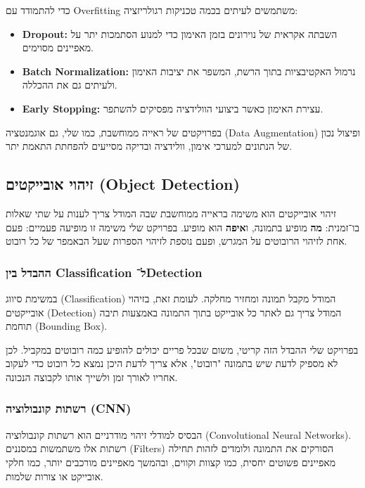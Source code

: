 כדי להתמודד עם \textenglish{Overfitting} משתמשים לעיתים בכמה טכניקות
רגולריזציה:
\begin{itemize}
\item \textbf{\textenglish{Dropout}:} השבתה אקראית של נוירונים בזמן
האימון כדי למנוע הסתמכות יתר על מאפיינים מסוימים.
\item \textbf{\textenglish{Batch Normalization}:} נרמול האקטיבציות
בתוך הרשת, המשפר את יציבות האימון ולעיתים גם את ההכללה.
\item \textbf{\textenglish{Early Stopping}:} עצירת האימון כאשר ביצועי
הוולידציה מפסיקים להשתפר.
\end{itemize}

בפרויקטים של ראייה ממוחשבת, כמו שלי, גם אוגמנטציה (\textenglish{Data
  Augmentation}) ופיצול נכון של הנתונים למערכי אימון, וולידציה ובדיקה
מסייעים להפחתת התאמת יתר.

\subsection{זיהוי אובייקטים (\textenglish{Object Detection})}

זיהוי אובייקטים הוא משימה בראייה ממוחשבת שבה המודל צריך לענות על שתי
שאלות בו־זמנית: \textbf{מה} מופיע בתמונה, ו\textbf{איפה} הוא מופיע.
בפרויקט שלי משימה זו מופיעה פעמיים: פעם אחת לזיהוי הרובוטים על המגרש,
ופעם נוספת לזיהוי הספרות שעל הבאמפר של כל רובוט.

\subsubsection{ההבדל בין \textenglish{Classification}
ל־\textenglish{Detection}}

במשימת סיווג (\textenglish{Classification}) המודל מקבל תמונה ומחזיר
מחלקה. לעומת זאת, בזיהוי אובייקטים (\textenglish{Detection}) המודל
צריך גם לאתר כל אובייקט בתוך התמונה באמצעות תיבה תוחמת
(\textenglish{Bounding Box}).

בפרויקט שלי ההבדל הזה קריטי, משום שבכל פריים יכולים להופיע כמה רובוטים
במקביל. לכן לא מספיק לדעת שיש בתמונה "רובוט", אלא צריך לדעת היכן נמצא
כל רובוט כדי לעקוב אחריו לאורך זמן ולשייך אותו לקבוצה הנכונה.

\subsubsection{רשתות קונבולוציה (\textenglish{CNN})}

הבסיס למודלי זיהוי מודרניים הוא רשתות קונבולוציה
(\textenglish{Convolutional Neural Networks}). רשתות אלו משתמשות
במסננים (\textenglish{Filters}) הסורקים את התמונה ולומדים לזהות תחילה
מאפיינים פשוטים יחסית, כמו קצוות וקווים, ובהמשך מאפיינים מורכבים יותר,
כמו חלקי אובייקט או צורות שלמות.

